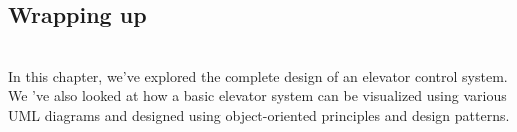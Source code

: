 \subsection{Wrapping up}\label{RK4cCJY8yhBHfOE2q80Va}
\\
In this chapter, we've explored the complete design of an elevator control system. We 've also looked at how a basic elevator system can be visualized using various UML diagrams and designed using object-oriented principles and design patterns.

